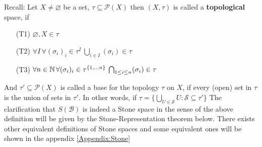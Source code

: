 Recall: Let $X\neq \varnothing$ be a set, $\tau \subseteq \mathcal{P}(X)$ then $(X,\tau)$ is called a \textbf{topological} space, if 
    \begin{enumerate}[leftmargin=1.5cm]
        \item[(T1)] $\varnothing, X\in \tau$
        \item[(T2)] $\forall I \,\forall (\sigma_i)_i\in \tau^I\: \bigcup_{i\in I}(\sigma_i)\in \tau$
        \item[(T3)] $\forall n\in \mathbb{N} \,\forall (\sigma_i)_i\in \tau^{\{1,\dots n\}}\: \bigcap_{1\leq i\leq n}(\sigma_i)\in \tau$
    \end{enumerate}
    And $\tau'\subseteq \mathcal{P}(X)$ is called a base for the topology $\tau$ on $X$,
    if every (open) set in $\tau$ is the union of sets in $\tau'$. 
    In other words, if $\tau = \{\bigcup_{U\in \mathcal{S}} U : \mathcal{S}\subseteq \tau'\}$
The clarification that $S(\mathcal{B})$ is indeed a Stone space in the sense of the above definition will be given by the Stone-Representation theorem below.
There exists other equivalent definitions of Stone spaces and some equivalent ones will be shown in the appendix \ref{Appendix:Stone}

